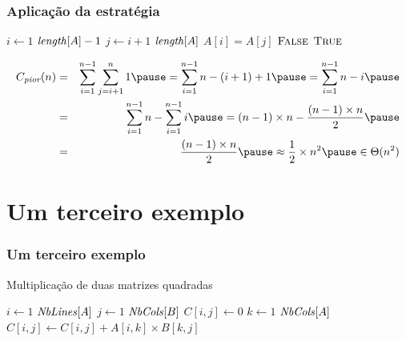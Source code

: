 \documentclass[handout]{beamer}
\begin{document}
\begin{frame}
\frametitle{Aplicação da estratégia}

\begin{small}
\begin{codebox}
\li \For $i \gets 1$ \To $\id{length}[A]-1$
\li \Do
\li   \For $j \gets i+1$ \To $\id{length}[A]$
\li   \Do
\li     \If $A[i] = A[j]$
\li     \Then
          \Return $\textnormal{\scshape False}$
        \End    
      \End    
    \End    
\li \Return $\textnormal{\scshape True}$
\end{codebox}
\end{small}

\begin{eqnarray*}
C_{\textit{pior}}(n) & = & \sum_{i = 1}^{n-1} \sum_{j = i+1}^{n} 1 \pause = \sum_{i=1}^{n-1} n - (i+1) + 1 \pause = \sum_{i=1}^{n-1} n - i \pause \\
& = & \sum_{i=1}^{n-1} n - \sum_{i=1}^{n-1} i \pause = (n-1)\times n - \frac{(n-1)\times n}{2} \pause \\
& = & \frac{(n-1)\times n}{2} \pause \approx \frac{1}{2}\times n^2 \pause \in \Theta(n^2)
\end{eqnarray*}
\end{frame}

\section{Um terceiro exemplo}
\begin{frame}
\frametitle{Um terceiro exemplo}
\begin{example}{Multiplicação de duas matrizes quadradas}
\begin{codebox}
\li \For $i \gets 1$ \To $\id{NbLines}[A]$
\li \Do
\li   \For $j \gets 1$ \To $\id{NbCols}[B]$
\li   \Do
\li     $C[i,j] \gets 0$
\li     \For $k \gets 1$ \To $\id{NbCols}[A]$
\li     \Do
\li     $C[i,j] \gets C[i,j] + A[i, k] \times B[k, j]$
        \End    
      \End    
    \End    
\end{codebox}
\end{example}
\end{frame}
\end{document}
